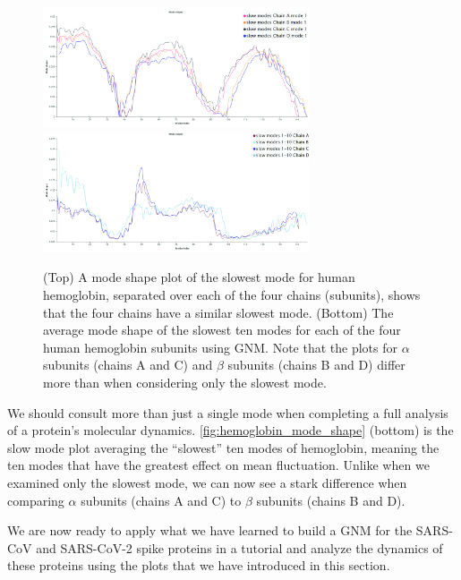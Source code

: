 \begin{figure}[h]
	\centering
	\mySfFamily
	\includegraphics[width = 0.7\textwidth]{../images_CMYK/hemoglobin_slowest_mode}\\[3ex]
	\includegraphics[width = 0.7\textwidth]{../images_CMYK/hemoglobin_mode_shape_avg}
	\caption{(Top) A mode shape plot of the slowest mode for human hemoglobin, separated over each of the four chains (subunits), shows that the four chains have a similar slowest mode. (Bottom) The average mode shape of the slowest ten modes for each of the four human hemoglobin subunits using GNM. Note that the plots for $\alpha$ subunits (chains A and C) and $\beta$ subunits (chains B and D) differ more than when considering only the slowest mode.}
	\label{fig:hemoglobin_mode_shape}
\end{figure}

We should consult more than just a single mode when completing a full analysis of a protein's molecular dynamics. \autoref{fig:hemoglobin_mode_shape} (bottom) is the slow mode plot averaging the ``slowest'' ten modes of hemoglobin, meaning the ten modes that have the greatest effect on mean fluctuation. Unlike when we examined only the slowest mode, we can now see a stark difference when comparing $\alpha$ subunits (chains A and C) to $\beta$ subunits (chains B and D).

We are now ready to apply what we have learned  to build a GNM for the SARS-CoV and SARS-CoV-2 spike proteins in a tutorial and analyze the dynamics of these proteins using the plots that we have introduced in this section.

\FloatBarrier
{}
